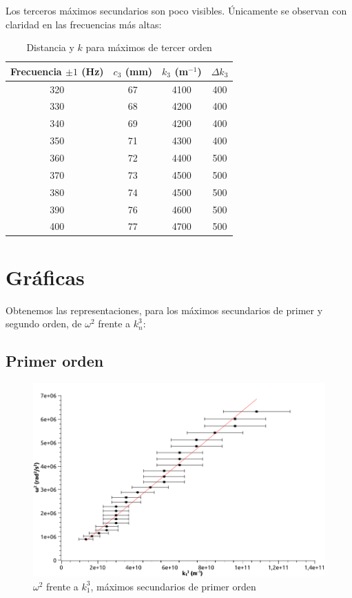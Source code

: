 \documentclass[a4paper,12pt,spanish]{article}
\begin{document}
	Los terceros máximos secundarios son poco visibles. Únicamente se observan con claridad en las frecuencias más altas:
	
	\begin{table}[H]
		\centering
		\begin{tabular}{|c|c|c|c|}
			\hline
			Frecuencia $\pm 1$ (Hz) & $c_3$ (mm) & $k_3$ (m$^{-1}$) & $\Delta k_3$ \\ \hline\hline
			320 & 67 & 4100 & 400 \\ \hline
			330 & 68 & 4200 & 400 \\ \hline
			340 & 69 & 4200 & 400 \\ \hline
			350 & 71 & 4300 & 400 \\ \hline
			360 & 72 & 4400 & 500 \\ \hline
			370 & 73 & 4500 & 500 \\ \hline
			380 & 74 & 4500 & 500 \\ \hline
			390 & 76 & 4600 & 500 \\ \hline
			400 & 77 & 4700 & 500 \\ \hline
		\end{tabular}
	\caption{Distancia y $k$ para máximos de tercer orden}
	\label{tab:tercerorden}
	\end{table}

	
	\section{Gráficas}
	

	
	Obtenemos las representaciones, para los máximos secundarios de primer y segundo orden, de $\omega^2$ frente a $k_n^3$:
	
	\subsection*{Primer orden}
	
\begin{figure}[H]
	\centering
	\includegraphics[width=0.9\linewidth]{../fotos/graficas/1_k13w2}
	\caption{$\omega^2$ frente a $k_1^3$, máximos secundarios de primer orden}
	\label{fig:1k13w2}
\end{figure}
\end{document}
